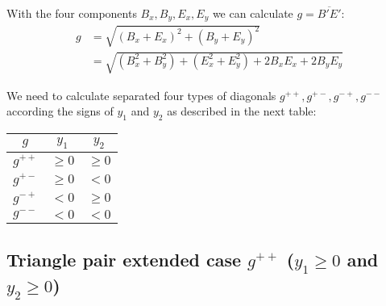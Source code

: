 \documentclass[11pt]{article}
\begin{document}
With the four components $B_x, B_y, E_x, E_y$ we can calculate $g = \overline{B'E'}$:
\begin{align}
g &= \sqrt{(B_x + E_x)^2 + (B_y + E_y)^2} \\
 &= \sqrt{(B_x^2 + B_y^2) + (E_x^2 + E_y^2) + 2B_xE_x + 2B_yE_y} \label{eq:tpeg}
\end{align}

We need to calculate separated four types of diagonals $g^{++},g^{+-},g^{-+},g^{--}$ according the signs of $y_1$ and $y_2$ as described in the next table:
\begin{center}
\begin{tabular}{| c c c |}
\hline
$g$ & $y_1$ & $y_2$ \\ [0.5ex]
\hline
$g^{++}$ & $\geq 0$ & $\geq 0$ \\
$g^{+-}$ & $\geq 0$ & $< 0$ \\
$g^{-+}$ & $< 0$ & $\geq 0$ \\
$g^{--}$ & $< 0$ & $< 0$ \\
\hline
\end{tabular}
\end{center}

\subsection{Triangle pair extended case $g^{++}$ ($y_1\geq 0$ and $y_2\geq 0$)}
\end{document}
